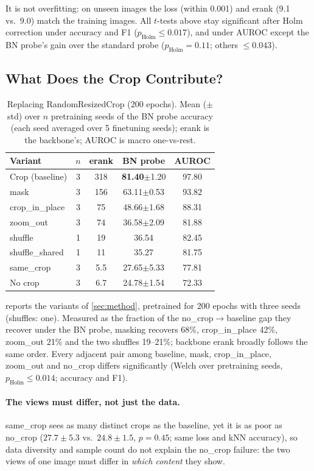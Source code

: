 \documentclass[10pt,twocolumn,letterpaper]{article}
\newcommand{\pmstd}[1]{{\scriptsize$\pm$#1}}
\begin{document}
It is not overfitting: on unseen images the loss (within 0.001) and erank (9.1 vs.\ 9.0) match the training images.
All $t$-tests above stay significant after Holm correction under accuracy and F1 ($p_\text{Holm}\le0.017$), and under AUROC except the BN probe's gain over the standard probe ($p_\text{Holm}{=}0.11$; others $\le0.043$).

\subsection{What Does the Crop Contribute?}
\label{sec:exp_crop}

\begin{table}[t]
\centering
\small
\setlength\tabcolsep{3pt}
\begin{tabular}{lcccc}
\toprule
Variant & $n$ & erank & BN probe & AUROC \\
\midrule
Crop (baseline) & 3 & 318 & \textbf{81.40}\pmstd{1.20} & 97.80 \\
mask & 3 & 156 & 63.11\pmstd{0.53} & 93.82 \\
crop\_in\_place & 3 & 75 & 48.66\pmstd{1.68} & 88.31 \\
zoom\_out & 3 & 74 & 36.58\pmstd{2.09} & 81.88 \\
shuffle & 1 & 19 & 36.54 & 82.45 \\
shuffle\_shared & 1 & 11 & 35.27 & 81.75 \\
same\_crop & 3 & 5.5 & 27.65\pmstd{5.33} & 77.81 \\
No crop & 3 & 6.7 & 24.78\pmstd{1.54} & 72.33 \\
\bottomrule
\end{tabular}
\caption{Replacing RandomResizedCrop (200 epochs). Mean (\pmstd{std}) over $n$ pretraining seeds of the BN probe accuracy (each seed averaged over 5 finetuning seeds); erank is the backbone's; AUROC is macro one-vs-rest.}
\label{tab:crop}
\end{table}

 reports the variants of \cref{sec:method}, pretrained for 200 epochs with three seeds (shuffles: one).
Measured as the fraction of the no\_crop$\to$baseline gap they recover under the BN probe, masking recovers 68\%, crop\_in\_place 42\%, zoom\_out 21\% and the two shuffles 19--21\%; backbone erank broadly follows the same order.
Every adjacent pair among baseline, mask, crop\_in\_place, zoom\_out and no\_crop differs significantly (Welch over pretraining seeds, $p_\text{Holm}\le0.014$; accuracy and F1).

\paragraph{The views must differ, not just the data.}
same\_crop sees as many distinct crops as the baseline, yet it is as poor as no\_crop ($27.7\pm5.3$ vs.\ $24.8\pm1.5$, $p{=}0.45$; same loss and kNN accuracy), so data diversity and sample count do not explain the no\_crop failure: the two views of one image must differ in \emph{which content} they show.
\end{document}
